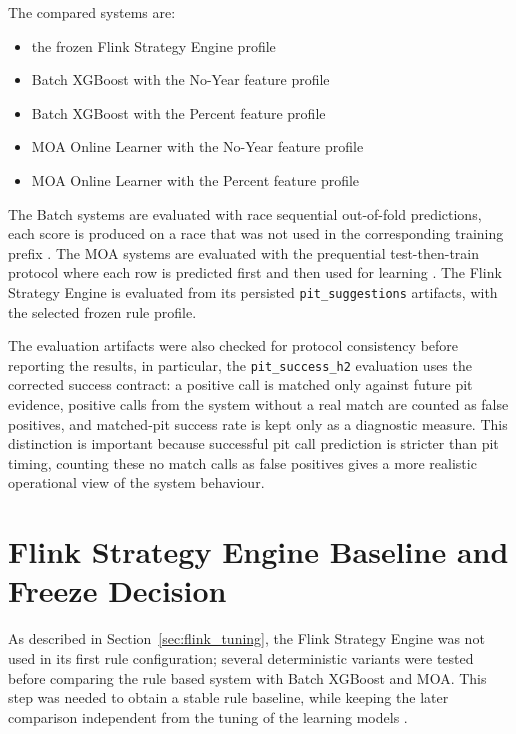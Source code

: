 The compared systems are:
\begin{itemize}
    \item the frozen Flink Strategy Engine profile
    \item Batch XGBoost with the No-Year feature profile
    \item Batch XGBoost with the Percent feature profile
    \item MOA Online Learner with the No-Year feature profile
    \item MOA Online Learner with the Percent feature profile
\end{itemize}

The Batch systems are evaluated with race sequential out-of-fold predictions, each score is produced on a race that was not used in the corresponding training prefix 
\cite{roberts2017cvstructured}.
The MOA systems are evaluated with the prequential test-then-train protocol where each row is predicted first and then used for learning \cite{bifet2010moa,oza2005boosting}. 
The Flink Strategy Engine is evaluated from its persisted \texttt{pit\_suggestions} artifacts, with the selected frozen rule profile.

The evaluation artifacts were also checked for protocol consistency before reporting the results, in particular, the \texttt{pit\_success\_h2} evaluation uses the corrected success
contract: a positive call is matched only against future pit evidence, positive calls from the system without a real match are counted as false positives,
and matched-pit success rate is kept only as a diagnostic measure.
This distinction is important because successful pit call prediction is stricter than pit timing,
counting these no match calls as false positives gives a more realistic operational view of the system behaviour.



\section{Flink Strategy Engine Baseline and Freeze Decision}

As described in Section~\ref{sec:flink_tuning}, the Flink Strategy Engine was not used in its first rule configuration; several deterministic variants were tested before
comparing the rule based system with Batch XGBoost and MOA. This step was needed to obtain a stable rule baseline, while keeping the later comparison independent from the
tuning of the learning models \cite{heilmeier2020race,carrasco2023optimization}.

